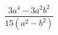 \begin{ex}[type=expression]
	\begin{condition}
		\(\dfrac{3a^4-3a^2b^2}{15(a^2-b^2)}\)
	\end{condition}
\end{ex}